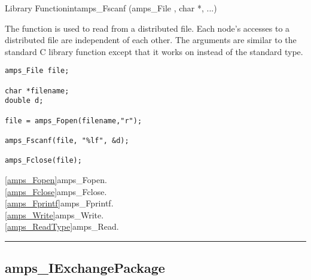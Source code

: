 \begin{deftypefn}{Library Function}{int}{amps\_Fscanf}
(amps_File , char *, ...) 

\DESCRIPTION

The function  is used to read from a distributed file.
Each node's accesses to a distributed file are independent of each
other.  The arguments are similar to the standard C library function
 except that it works on  instead of the
standard  type.

\EXAMPLE

\begin{display}\begin{verbatim}
amps_File file;

char *filename;
double d;

file = amps_Fopen(filename,"r");

amps_Fscanf(file, "%lf", &d);

amps_Fclose(file);
\end{verbatim}\end{display}

\SEEALSO
\vref{amps_Fopen}{amps\_Fopen}. \\
\vref{amps_Fclose}{amps\_Fclose}. \\
\vref{amps_Fprintf}{amps\_Fprintf}. \\
\vref{amps_Write}{amps\_Write}. \\
\vref{amps_ReadType}{amps\_Read}. \\

\end{deftypefn}



\noindent\rule{\textwidth}{1mm}

\subsection{amps\_IExchangePackage}
\label{amps_IExchangePackage}


